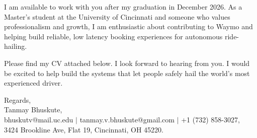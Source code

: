 \documentclass[11pt]{letter}
\begin{document}
\begin{letter}{}
I am available to work with you after my graduation in December 2026. As a Master's student at the University of Cincinnati and someone who values professionalism and growth, I am enthusiastic about contributing to Waymo and helping build reliable, low latency booking experiences for autonomous ride-hailing.

Please find my CV attached below. I look forward to hearing from you. I would be excited to help build the systems that let people safely hail the world's most experienced driver.

{\setlength{\parskip}{0pt}
Regards,\\
Tanmay Bhuskute,\\
bhuskutv@mail.uc.edu $\mid$ tanmay.v.bhuskute@gmail.com $\mid$ +1 (732) 858-3027,\\
3424 Brookline Ave, Flat 19, Cincinnati, OH 45220.
}

\end{letter}
\end{document}
